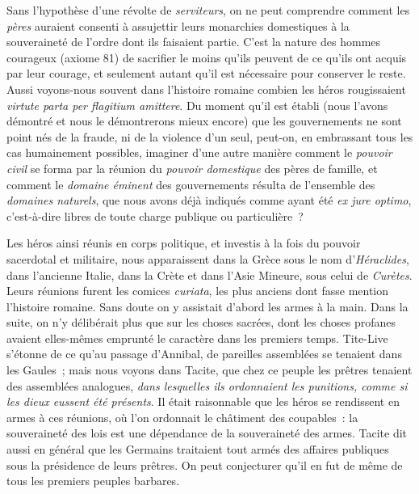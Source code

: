 \documentclass[french,twoside]{book} %
\begin{document}
Sans l’hypothèse d’une révolte de {\itshape serviteurs}, on ne peut comprendre comment les {\itshape pères} auraient consenti à assujettir leurs monarchies domestiques à la souveraineté de l’ordre dont ils faisaient partie. C’est la nature des hommes courageux (axiome 81) de sacrifier le moins qu’ils peuvent de ce qu’ils ont  acquis par leur courage, et seulement autant qu’il est nécessaire pour conserver le reste. Aussi voyons-nous souvent dans l’histoire romaine combien les héros rougissaient {\itshape virtute parta per flagitium amittere}. Du moment qu’il est établi (nous l’avons démontré et nous le démontrerons mieux encore) que les gouvernements ne sont point nés de la fraude, ni de la violence d’un seul, peut-on, en embrassant tous les cas humainement possibles, imaginer d’une autre manière comment le {\itshape pouvoir civil} se forma par la réunion du {\itshape pouvoir domestique} des pères de famille, et comment le {\itshape domaine éminent} des gouvernements résulta de l’ensemble des {\itshape domaines naturels}, que nous avons déjà indiqués comme ayant été {\itshape ex jure optimo}, c’est-à-dire libres de toute charge publique ou particulière ?\par
Les héros ainsi réunis en corps politique, et investis à la fois du pouvoir sacerdotal et militaire, nous apparaissent dans la Grèce sous le nom d’{\itshape Héraclides}, dans l’ancienne Italie, dans la Crète et dans l’Asie Mineure, sous celui de {\itshape Curètes}. Leurs réunions furent les comices {\itshape curiata}, les plus anciens dont fasse mention l’histoire romaine. Sans doute on y assistait d’abord les armes à la main. Dans la suite, on n’y délibérait plus que sur les choses sacrées, dont les choses profanes avaient elles-mêmes emprunté le caractère dans les premiers temps. Tite-Live s’étonne de ce qu’au passage d’Annibal, de pareilles assemblées se tenaient dans les Gaules ; mais nous voyons dans Tacite, que chez ce  peuple les prêtres tenaient des assemblées analogues, \emph{{\itshape dans lesquelles ils ordonnaient les punitions, comme si les dieux eussent été présents}}. Il était raisonnable que les héros se rendissent en armes à ces réunions, où l’on ordonnait le châtiment des coupables : la souveraineté des lois est une dépendance de la souveraineté des armes. Tacite dit aussi en général que les Germains traitaient tout armés des affaires publiques sous la présidence de leurs prêtres. On peut conjecturer qu’il en fut de même de tous les premiers peuples barbares.\par
\end{document}
